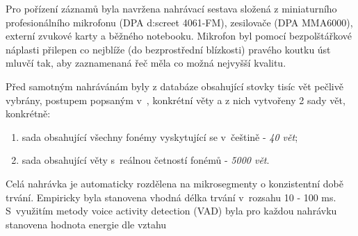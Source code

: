 
Pro pořízení záznamů byla navržena nahrávací sestava složená z miniaturního profesionálního mikrofonu (DPA d:screet 4061-FM), zesilovače (DPA MMA6000), externí zvukové karty a běžného notebooku. Mikrofon byl pomocí bezpolštářkové náplasti přilepen co nejblíže (do bezprostřední blízkosti) pravého koutku úst mluvčí tak, aby zaznamenaná řeč měla co možná nejvyšší kvalitu.

Před samotným nahrávánám byly z databáze obsahující stovky tisíc vět pečlivě vybrány, postupem popsaným v~\cite{Radova2000}, konkrétní věty a z nich vytvořeny 2 sady vět, konkrétně:

\begin{enumerate}
  \item sada obsahující všechny fonémy vyskytující se v~češtině - \textit{40 vět};
  \item sada obsahující věty s~reálnou četností fonémů - \textit{5000 vět}.
\end{enumerate}


Celá nahrávka je automaticky rozdělena na mikrosegmenty o konzistentní době trvání. Empiricky byla stanovena vhodná délka trvání v~rozsahu 10 - 100 ms. S~využitím metody voice activity detection (VAD) byla pro každou nahrávku stanovena hodnota energie dle vztahu

